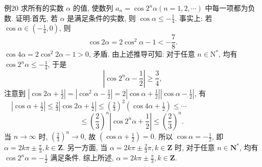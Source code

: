 例20 求所有的实数 $\alpha$ 的值, 使数列 $a_n= \cos 2^n \alpha(n=1,2, \cdots)$ 中每一项都为负数.
证明:首先, 若 $\alpha$ 是满足条件的实数, 则 $\cos \alpha \leqslant-\frac{1}{4}$.
事实上: 若 $\cos \alpha \in\left(-\frac{1}{4}, 0\right)$, 则
$$
\cos 2 \alpha=2 \cos ^2 \alpha-1<-\frac{7}{8} .
$$
$\cos 4 \alpha=2 \cos ^2 2 \alpha-1>0$, 矛盾.
由上述推导可知: 对于任意 $n \in \mathrm{N}^*$, 均有 $\cos 2^n \alpha \leqslant-\frac{1}{4}$, 于是
$$
\left|\cos 2^n \alpha-\frac{1}{2}\right| \geqslant \frac{3}{4},
$$
注意到 $\left|\cos 2 \alpha+\frac{1}{2}\right|=\left|\cos ^2 \alpha-\frac{1}{2}\right|=2\left|\cos \alpha+\frac{1}{2}\right|\left|\cos \alpha-\frac{1}{2}\right|$,
有 $\quad\left|\cos \alpha+\frac{1}{2}\right| \leqslant \frac{2}{3}\left|\cos 2 \alpha+\frac{1}{2}\right| \leqslant\left(\frac{2}{3}\right)^2\left(\cos 4 \alpha+\frac{1}{2}\right) \leqslant \cdots$
$$
\leqslant\left(\frac{2}{3}\right)^n\left|\cos 2^n \alpha+\frac{1}{2}\right| \leqslant\left(\frac{2}{3}\right)^n \text {. }
$$
当 $n \rightarrow \infty$ 时, $\left(\frac{2}{3}\right)^n \rightarrow 0$, 故 $\left(\cos \alpha+\frac{1}{2}\right)=0$.
所以 $\cos \alpha=-\frac{1}{2}$, 即 $\alpha=2 k \pi \pm \frac{\pi}{3}, k \in \mathbf{Z}$.
另一方面, 当 $\alpha=2 k \pi \pm \frac{2}{3} \pi, k \in \mathbf{Z}$ 时, 对于任意 $n \in \mathbf{N}^*$, 均有 $\cos 2^n \alpha= -\frac{1}{2}$ 满足条件.
综上所述, $\alpha=2 k \pi \pm \frac{\pi}{3}, k \in \mathbf{Z}$.


